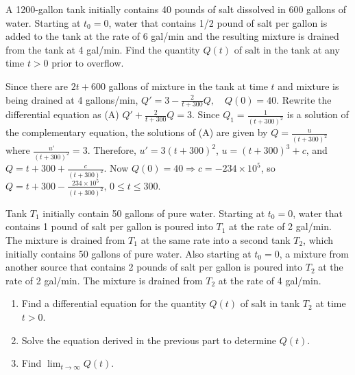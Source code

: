 \documentclass{ximera}
\begin{document}
\begin{problem}\label{exer:4.2.14}
A 1200-gallon tank initially contains 40 pounds of salt
dissolved in 600 gallons of water.  Starting at $t_0=0$,
water that contains 1/2 pound of salt per gallon is added to
the tank at the rate of 6 gal/min and the
resulting mixture  is drained from the tank at 4 gal/min.  Find the
quantity $Q(t)$ of salt in the tank at any time $t > 0$
prior to overflow.

\begin{solution}
Since there are $2t+600$ gallons of mixture in the tank at
time $t$ and mixture is being drained at 4
gallons/min, $Q'=3-\frac{2}{t+300}Q,\quad Q(0)=40$.
 Rewrite the differential
equation
as (A) $Q'+\frac{2}{t+300}Q=3$. Since $Q_1=\frac{1}{(t+300)^2}$
is a
solution of the complementary equation, the solutions of (A) are given
by
$Q=\frac{u}{(t+300)^2}$ where $\frac{u'}{(t+300)^2}=3$. Therefore,
$u'=3(t+300)^2$,
$u=(t+300)^3+c$, and $Q=t+300+\frac{c}{(t+300)^2}$.
 Now
$Q(0)=40\Rightarrow c=-234\times10^5$, so
 $Q= t+300-\frac{234 \times 10^5}{(t+300)^2},
\, 0\le t\le300$.
\end{solution}
\end{problem}

\begin{problem}\label{exer:4.2.15}
Tank $T_1$  initially contain 50 gallons of pure water. Starting at
$t_0=0$,  water that contains 1 pound of salt per gallon is poured into
$T_1$ at  the rate of  2 gal/min.
The  mixture is drained from
$T_1$ at the same rate into a second tank $T_2$, which initially
contains  50 gallons of pure water.  Also starting at
$t_0=0$, a mixture from another source that contains 2  pounds of salt
per gallon is poured
into $T_2$  at the rate of 2 gal/min.  The  mixture is drained
from $T_2$ at the rate of 4 gal/min.


\begin{enumerate}
\item %
 Find a differential
equation for the quantity $Q(t)$ of salt in  tank $T_2$ at time $t > 0$.
\item %
Solve the equation derived  in the previous part to determine $Q(t)$.
\item %
 Find $\lim_{t\to\infty}Q(t)$.
\end{enumerate}
\end{problem}
\end{document}
